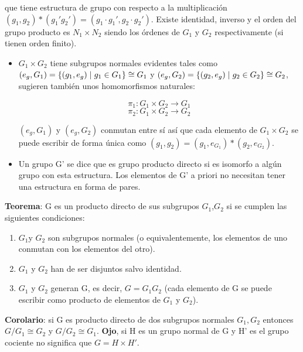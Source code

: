 \documentclass{article}
\begin{document}
que tiene estructura de grupo con respecto a la multiplicación $(g_1,g_2)*(g_1'g_2')=(g_1\cdot g_1',g_2\cdot g_2')$. Existe identidad, inverso y el orden del grupo producto es $N_1\times N_2$ siendo los órdenes de $G_1$ y $G_2$ respectivamente (si tienen orden finito).

\begin{itemize}
        \item $G_1 \times G_2$ tiene subgrupos normales evidentes tales como $(e_g,G_1)=\lbrace (g_1,e_g) \hspace{0.1cm} | \hspace{0.1cm}g_1 \in G_1 \rbrace \cong G_1$ y $(e_g,G_2)=\lbrace (g_2,e_g) \hspace{0.1cm} | \hspace{0.1cm}g_2 \in G_2 \rbrace \cong G_2$, sugieren también unos homomorfismos naturales:

    $$\pi _1: G_1\times G_2 \to G_1$$
    $$\pi _2 : G_1\times G_2 \to G_2$$

    $(e_g,G_1)$ y $(e_g,G_2)$ conmutan entre sí así que cada elemento de $G_1 \times G_2$ se puede escribir de forma única como $(g_1,g_2)=(g_1,e_{G_1})*(g_2,e_{G_2})$.
    \item Un grupo G' se dice que es grupo producto directo si es isomorfo a algún grupo con esta estructura. Los elementos de G' a priori no necesitan tener una estructura en forma de pares.

\end{itemize}

 \textbf{Teorema}: G es un producto directo de sus subgrupos $G_1$,$G_2$ si se cumplen las siguientes condiciones:

 \begin{enumerate}
     \item $G_1$y $G_2$ son subgrupos normales (o equivalentemente, los elementos de uno conmutan con los elementos del otro).
     \item $G_1$ y $G_2$ han de ser disjuntos salvo identidad.
     \item $G_1$ y $G_2$ generan G, es decir, $G=G_1G_2$ (cada elemento de G se puede escribir como producto de elementos de $G_1$ y $G_2$).
 \end{enumerate}

 \textbf{Corolario}: si G es producto directo de dos subgrupos normales $G_1,G_2$ entonces $G/G_1 \cong G_2$ y $G/G_2 \cong G_1$. \textbf{Ojo}, si H es un grupo normal de G y H' es el grupo cociente no significa que $G=H\times H'$.
\end{document}
